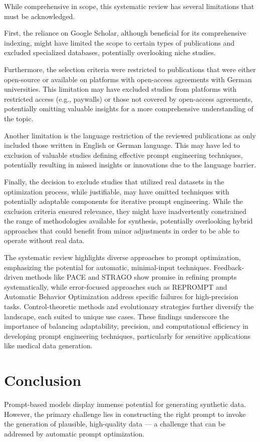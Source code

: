\documentclass[runningheads]{llncs}
\begin{document}
While comprehensive in scope, this systematic review has several limitations that must be acknowledged.

First, the reliance on Google Scholar, although beneficial for its comprehensive indexing, might have limited the scope to certain types of publications and excluded specialized databases, potentially overlooking niche studies. 

Furthermore, the selection criteria were restricted to publications that were either open-source or available on platforms with open-access agreements with German universities. This limitation may have excluded studies from platforms with restricted access (e.g., paywalls) or those not covered by open-access agreements, potentially omitting valuable insights for a more comprehensive understanding of the topic.

Another limitation is the language restriction of the reviewed publications as only included those written in English or German language. This may have led to exclusion of valuable studies defining effective prompt engineering techniques, potentially resulting in missed insights or innovations due to the language barrier.

Finally, the decision to exclude studies that utilized real datasets in the optimization process, while justifiable, may have omitted techniques with potentially adaptable components for iterative prompt engineering. While the exclusion criteria ensured relevance, they might have inadvertently constrained the range of methodologies available for synthesis, potentially overlooking hybrid approaches that could benefit from minor adjustments in order to be able to operate without real data.

The systematic review highlights diverse approaches to prompt optimization, emphasizing the potential for automatic, minimal-input techniques. Feedback-driven methods like PACE and STRAGO show promise in refining prompts systematically, while error-focused approaches such as REPROMPT and Automatic Behavior Optimization address specific failures for high-precision tasks. Control-theoretic methods and evolutionary strategies further diversify the landscape, each suited to unique use cases. These findings underscore the importance of balancing adaptability, precision, and computational efficiency in developing prompt engineering techniques, particularly for sensitive applications like medical data generation.


\section{Conclusion}
Prompt-based models display immense potential for generating synthetic data. However, the primary challenge lies in constructing the right prompt to invoke the generation of plausible, high-quality data — a challenge that can be addressed by automatic prompt optimization.
\end{document}
